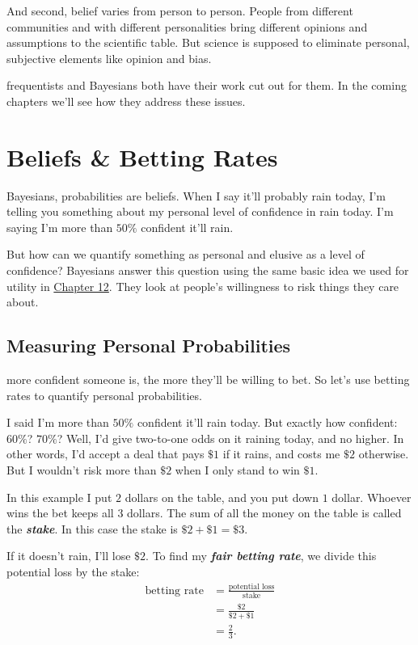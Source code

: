 \documentclass[justified]{tufte-book}
\theoremstyle{definition}
\theoremstyle{definition}
\theoremstyle{definition}
\theoremstyle{remark}
\begin{document}
And second, belief varies from person to person. People from different
communities and with different personalities bring different opinions
and assumptions to the scientific table. But science is supposed to
eliminate personal, subjective elements like opinion and bias.

 frequentists and Bayesians both have their work cut out
for them. In the coming chapters we'll see how they address these
issues.

\hypertarget{beliefs-betting-rates}{%
\chapter{Beliefs \& Betting Rates}\label{beliefs-betting-rates}}

 Bayesians, probabilities are beliefs. When I say it'll
probably rain today, I'm telling you something about my personal level
of confidence in rain today. I'm saying I'm more than \(50\%\) confident
it'll rain.

But how can we quantify something as personal and elusive as a level of
confidence? Bayesians answer this question using the same basic idea we
used for utility in \protect\hyperlink{utility}{Chapter 12}. They look
at people's willingness to risk things they care about.

\hypertarget{measuring-personal-probabilities}{%
\section{Measuring Personal
Probabilities}\label{measuring-personal-probabilities}}

 more confident someone is, the more they'll be willing
to bet. So let's use betting rates to quantify personal probabilities.

I said I'm more than \(50\%\) confident it'll rain today. But exactly
how confident: \(60\%\)? \(70\%\)? Well, I'd give two-to-one odds on it
raining today, and no higher. In other words, I'd accept a deal that
pays \(\$1\) if it rains, and costs me \(\$2\) otherwise. But I wouldn't
risk more than \(\$2\) when I only stand to win \(\$1\).

In this example I put \(2\) dollars on the table, and you put down \(1\)
dollar. Whoever wins the bet keeps all \(3\) dollars. The sum of all the
money on the table is called the \textbf{\emph{stake}}. In this case the
stake is \(\$2 + \$1 = \$3\).

If it doesn't rain, I'll lose \(\$2\). To find my \textbf{\emph{fair
betting rate}}, we divide this potential loss by the stake: \[
  \begin{aligned}
    \mbox{betting rate} &= \frac{\mbox{potential loss}}{\mbox{stake}}\\
                        &= \frac{\$2}{\$2 + \$1}\\
                        &= \frac{2}{3}.
  \end{aligned}
\]
\end{document}
